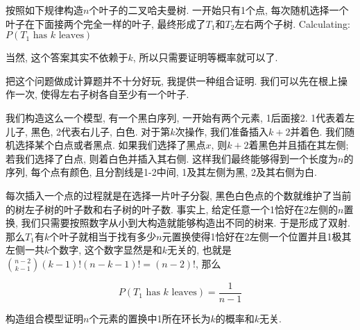 	\begin{prob} [二叉树$\uppercase\expandafter{\romannumeral5}$]
		
		按照如下规律构造$n$个叶子的二叉哈夫曼树. 一开始只有1个点, 每次随机选择一个叶子在下面接两个完全一样的叶子, 最终形成了$T_1$和$T_2$左右两个子树. Calculating: $P(T_1 \text{ has } k \text{ leaves})$
		
		当然, 这个答案其实不依赖于$k$, 所以只需要证明等概率就可以了.
		
		\sol
		
		把这个问题做成计算题并不十分好玩, 我提供一种组合证明. 我们可以先在根上操作一次, 使得左右子树各自至少有一个叶子.
		
		我们构造这么一个模型, 有一个黑白序列, 一开始有两个元素, 1后面接2. 1代表着左儿子, 黑色, 2代表右儿子, 白色. 对于第$k$次操作, 我们准备插入$k + 2$并着色. 我们随机选择某个白点或者黑点. 如果我们选择了黑点$x$, 则$k + 2$着黑色并且插在其左侧; 若我们选择了白点, 则着白色并插入其右侧. 这样我们最终能够得到一个长度为$n$的序列, 每个点有颜色, 且分割线是1-2中间, 1及其左侧为黑, 2及其右侧为白. 
		
		每次插入一个点的过程就是在选择一片叶子分裂, 黑色白色点的个数就维护了当前的树左子树的叶子数和右子树的叶子数. 事实上, 给定任意一个1恰好在2左侧的$n$置换, 我们只需要按照数字从小到大构造就能够构造出不同的树来. 于是形成了双射. 那么$T_1$有$k$个叶子就相当于找有多少$n$元置换使得1恰好在2左侧一个位置并且1极其左侧一共$k$个数字, 这个数字显然是和$k$无关的, 也就是$\binom{n - 2}{k - 1} (k - 1)! (n - k - 1)! = (n - 2)!$, 那么
		
		\begin{equation*}
			P(T_1 \text{ has } k \text{ leaves}) = \dfrac{1}{n - 1}
		\end{equation*}
		
	\end{prob}

	\begin{home}
		构造组合模型证明$n$个元素的置换中1所在环长为$k$的概率和$k$无关.
	\end{home}


